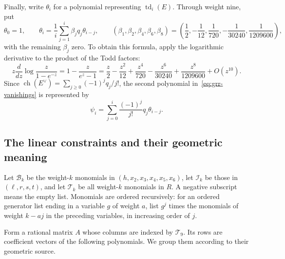 Finally, write $\theta_i$ for a polynomial representing
$\operatorname{td}_i(E)$. Through weight nine, put
\begin{equation}\label{eq:todd-recursion}
 \theta_0=1,\qquad
 \theta_i=\frac1i\sum_{j=1}^i\beta_jq_j\theta_{i-j},\qquad
 (\beta_1,\beta_2,\beta_4,\beta_6,\beta_8)
 =\left(\frac12,-\frac1{12},\frac1{720},-\frac1{30240},
         \frac1{1209600}\right),
\end{equation}
with the remaining $\beta_j$ zero. To obtain this formula, apply the
logarithmic derivative to the product of the Todd factors:
\[
 z\frac{d}{dz}\log\frac{z}{1-e^{-z}}
  =1-\frac{z}{e^z-1}
  =\frac z2-\frac{z^2}{12}+\frac{z^4}{720}
       -\frac{z^6}{30240}+\frac{z^8}{1209600}+O(z^{10}).
\]
Since $\operatorname{ch}(E^\vee)=\sum_{j\ge0}(-1)^jq_j/j!$, the second
polynomial in~\eqref{eq:grr-vanishings} is represented by
\begin{equation}\label{eq:todd-dual}
 \psi_i=\sum_{j=0}^i\frac{(-1)^j}{j!}q_j\theta_{i-j}.
\end{equation}

\subsection{The linear constraints and their geometric meaning}

Let $\mathcal B_k$ be the weight-$k$ monomials in
$(h,x_2,x_3,x_4,x_5,x_6)$, let $\mathcal I_k$ be those in
$(\ell,r,s,t)$, and let $\mathcal T_k$ be all weight-$k$ monomials in
$R$. A negative subscript means the empty list. Monomials are ordered
recursively: for an ordered generator list ending in a variable $g$ of
weight $a$, list $g^j$ times the monomials of weight $k-aj$ in the
preceding variables, in increasing order of $j$.

Form a rational matrix $A$ whose columns are indexed by $\mathcal T_9$.
Its rows are coefficient vectors of the following polynomials. We
group them according to their geometric source.

